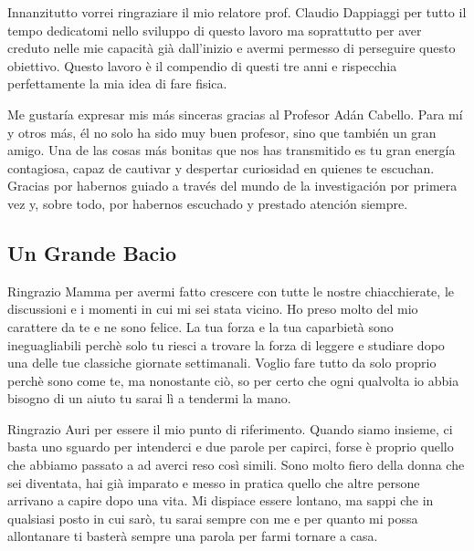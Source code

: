 \vspace{0.2cm}

 Innanzitutto vorrei ringraziare il mio relatore prof. Claudio Dappiaggi per tutto il tempo dedicatomi nello sviluppo di questo lavoro ma soprattutto per aver creduto nelle mie capacità già dall’inizio e avermi permesso di perseguire questo obiettivo. Questo lavoro è il compendio di questi tre anni e rispecchia perfettamente la mia idea di fare fisica.
 
 \vspace{0.2cm}

Me gustaría expresar mis más sinceras gracias al Profesor Adán Cabello. Para mí y otros más, él no solo ha sido muy buen profesor, sino que también un gran amigo. Una de las cosas más bonitas que nos has transmitido es tu gran energía contagiosa, capaz de cautivar y despertar curiosidad en quienes te escuchan. Gracias por habernos guiado a través del mundo de la investigación por primera vez y, sobre todo, por habernos escuchado y prestado atención siempre.

\subsection*{Un Grande Bacio}

 Ringrazio Mamma per avermi fatto crescere con tutte le nostre chiacchierate, le discussioni e i momenti in cui mi sei stata vicino. Ho preso molto del mio carattere da te e ne sono felice. La tua forza e la tua caparbietà sono ineguagliabili perchè solo tu riesci a trovare la forza di leggere e studiare dopo una delle tue classiche giornate settimanali. Voglio fare tutto da solo proprio perchè sono come te, ma nonostante ciò, so per certo che ogni qualvolta io abbia bisogno di un aiuto tu sarai lì a tendermi la mano.
 
 \vspace{0.2cm}

Ringrazio Auri per essere il mio punto di riferimento. Quando siamo insieme, ci basta uno sguardo per intenderci e due parole per capirci, forse è proprio quello che abbiamo passato a ad averci reso così simili. Sono molto fiero della donna che sei diventata, hai già imparato e messo in pratica quello che altre persone arrivano a capire dopo una vita. Mi dispiace essere lontano, ma sappi che in qualsiasi posto in cui sarò, tu sarai sempre con me e per quanto mi possa allontanare ti basterà sempre una parola per farmi tornare a casa.

\vspace{0.2cm}

